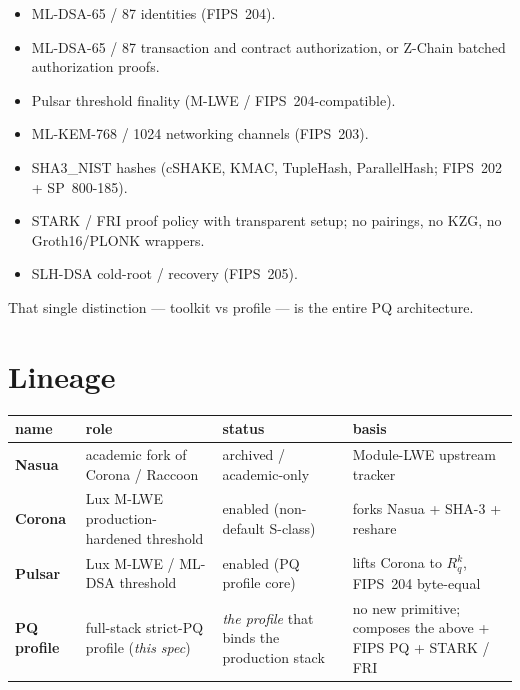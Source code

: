 \documentclass[11pt,a4paper]{article}
\newcommand{\PQ}{\textsf{PQ}}
\newcommand{\Rq}{R_q}
\begin{document}
\begin{itemize}[leftmargin=*, itemsep=0pt]
\item ML-DSA-65 / 87 identities (FIPS~204).
\item ML-DSA-65 / 87 transaction and contract authorization, or
Z-Chain batched authorization proofs.
\item Pulsar threshold finality (M-LWE / FIPS~204-compatible).
\item ML-KEM-768 / 1024 networking channels (FIPS~203).
\item SHA3\_NIST hashes (cSHAKE, KMAC, TupleHash, ParallelHash;
FIPS~202 + SP~800-185).
\item STARK / FRI proof policy with transparent setup; no
pairings, no KZG, no Groth16/PLONK wrappers.
\item SLH-DSA cold-root / recovery (FIPS~205).
\end{itemize}

That single distinction --- toolkit vs profile --- is the entire
\PQ{} architecture.

\section{Lineage}
\label{sec:lineage}

\begin{center}\small
\begin{tabular}{l l l l}
\toprule
name & role & status & basis \\
\midrule
\textbf{Nasua}   & academic fork of Corona / Raccoon          & archived / academic-only & Module-LWE upstream tracker \\
\textbf{Corona}  & Lux M-LWE production-hardened threshold        & enabled (non-default S-class) & forks Nasua + SHA-3 + reshare \\
\textbf{Pulsar}  & Lux M-LWE / ML-DSA threshold                   & enabled (PQ profile core) & lifts Corona to $\Rq^k$, FIPS~204 byte-equal \\
\textbf{PQ profile} & full-stack strict-PQ profile (\emph{this spec}) & \emph{the profile} that binds the production stack & no new primitive; composes the above + FIPS PQ + STARK / FRI \\
\bottomrule
\end{tabular}
\end{center}

\end{document}
